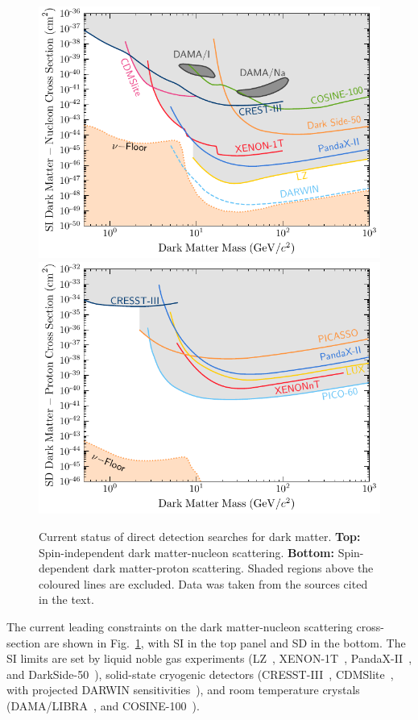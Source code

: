 \begin{figure}
    \centering
    \includegraphics{img/chapter_1/DM_limits_SI.pdf}
    \includegraphics{img/chapter_1/DM_limits_SD_p.pdf}
    \caption{Current status of direct detection searches for dark matter. \textbf{Top:} Spin-independent dark matter-nucleon scattering. \textbf{Bottom:} Spin-dependent dark matter-proton scattering. Shaded regions above the coloured lines are excluded. Data was taken from the sources cited in the text.}
    \label{fig:direct_detection_lims}
\end{figure}

The current leading constraints on the dark matter-nucleon scattering cross-section
are shown in Fig.~\ref{fig:direct_detection_lims}, with SI in the top panel and SD in the bottom.
The SI limits are set by liquid noble gas experiments (LZ~\cite{LZ:2022lsv_jul_FirstDarkMatter}, 
XENON-1T~\cite{XENON:2020gfr_mar_SearchCoherentElastic}, PandaX-II~\cite{PandaX-4T:2021bab_dec_DarkMatterSearch},
and DarkSide-50~\cite{DarkSide:2022dhx_mar_SearchDarkMatterNucleon}), solid-state cryogenic detectors (CRESST-III~\cite{CRESST:2019jnq_nov_FirstresultsCRESSTIII}, CDMSlite~\cite{SuperCDMS:2023sql_jun_SearchLowmassDark}, with projected DARWIN sensitivities~\cite{Aalbers:2022dzr_dec_Nextgenerationliquidxenon}), 
and room temperature crystals (DAMA/LIBRA~\cite{Savage:2008er_CompatibilityDAMALIBRA}, and COSINE-100~\cite{COSINE-100:2021xqn_nov_StrongconstraintsCOSINE100}). 


